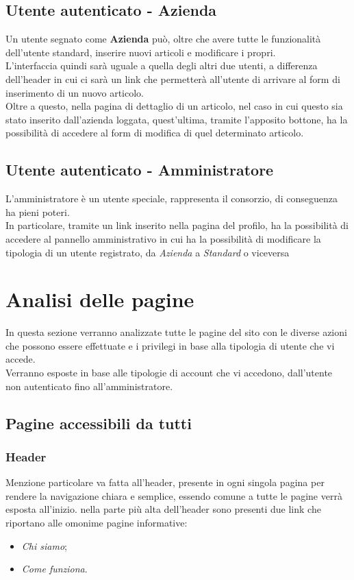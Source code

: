 \subsection{Utente autenticato - Azienda}
Un utente segnato come \textbf{Azienda} può, oltre che avere tutte le funzionalità dell'utente standard, inserire nuovi articoli e modificare i propri.\\ 	
L'interfaccia quindi sarà uguale a quella degli altri due utenti, a differenza dell'header in cui ci sarà un link che permetterà all'utente di arrivare al form di inserimento di un nuovo articolo.\\
Oltre a questo, nella pagina di dettaglio di un articolo, nel caso in cui questo sia stato inserito dall'azienda loggata, quest'ultima, tramite l'apposito bottone, ha la possibilità di accedere al form di modifica di quel determinato articolo.
	
\subsection{Utente autenticato - Amministratore}
L'amministratore è un utente speciale, rappresenta il consorzio, di conseguenza ha pieni poteri.\\
In particolare, tramite un link inserito nella pagina del profilo, ha la possibilità di accedere al pannello amministrativo in cui ha la possibilità di modificare la tipologia di un utente registrato, da \textit{Azienda} a \textit{Standard} o viceversa

\newpage

\section{Analisi delle pagine}
In questa sezione verranno analizzate tutte le pagine del sito con le diverse azioni che possono essere effettuate e i privilegi in base alla tipologia di utente che vi accede.\\
Verranno esposte in base alle tipologie di account che vi accedono, dall'utente non autenticato fino all'amministratore.
\subsection{Pagine accessibili da tutti}
	\subsubsection{Header}
		Menzione particolare va fatta all'header, presente in ogni singola pagina per rendere la navigazione chiara e semplice, essendo comune a tutte le pagine verrà esposta all'inizio.
		nella parte più alta dell'header sono presenti due link che riportano alle omonime pagine informative:
		\begin{itemize}
			\item \textit{Chi siamo};
			\item \textit{Come funziona}.
		\end{itemize}
	
